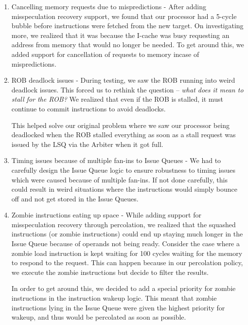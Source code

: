 \documentclass{article}
\begin{document}
\begin{enumerate}
	\item Cancelling memory requests due to mispredictions - After adding
	misspeculation recovery support, we found that our processor had a
	5-cycle bubble before instructions were fetched from the new target. On
	investigating more, we realized that it was because the I-cache was
	busy requesting an address from memory that would no longer be needed.
	To get around this, we added support for cancellation of requests to
	memory incase of mispredictions.
	
	\item ROB deadlock issues - During testing, we saw the ROB running into
	weird deadlock issues. This forced us to rethink the question --
	\textit{what does it mean to stall for the ROB?} We realized that even
	if the ROB is stalled, it must continue to commit instructions to avoid
	deadlocks. 
	
	This helped solve our original problem where we saw our processor being
	deadlocked when the ROB stalled everything as soon as a stall request
	was issued by the LSQ via the Arbiter when it got full.
	
	\item Timing issues because of multiple fan-ins to Issue Queues - We
	had to carefully design the Issue Queue logic to ensure robustness to
	timing issues which were caused because of multiple fan-ins. If not
	done carefully, this could result in weird situations where the
	instructions would simply bounce off and not get stored in the Issue
	Queues.
		
	\item Zombie instructions eating up space - While adding support for
	misspeculation recovery through percolation, we realized that the
	squashed instructions (or zombie instructions) could end up staying
	much longer in the Issue Queue because of operands not being ready.
	Consider the case where a zombie load instruction is kept waiting for
	100 cycles waiting for the memory to respond to the request. This can
	happen because in our percolation policy, we execute the zombie
	instructions but decide to filter the results. 
	
	In order to get around this, we decided to add a special priority for
	zombie instructions in the instruction wakeup logic. This meant that
	zombie instructions lying in the Issue Queue were given the highest
	priority for wakeup, and thus would be percolated as soon as possible.
\end{enumerate}
\end{document}
